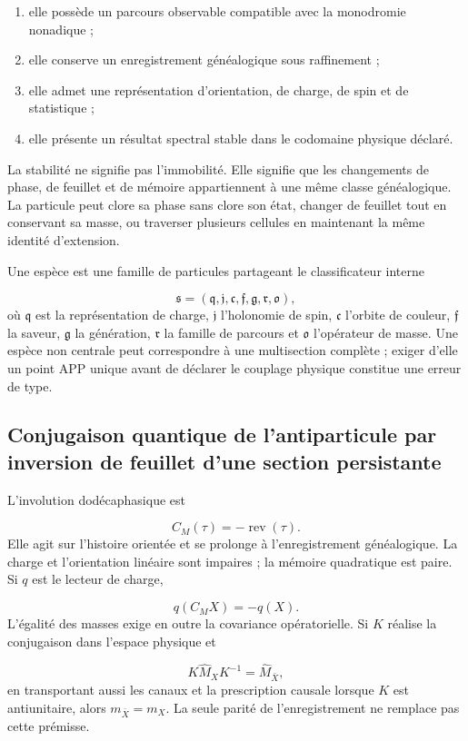 \begin{enumerate}
\item elle possède un parcours observable compatible avec la monodromie nonadique ;
\item elle conserve un enregistrement généalogique sous raffinement ;
\item elle admet une représentation d'orientation, de charge, de spin et de statistique ;
\item elle présente un résultat spectral stable dans le codomaine physique déclaré.
\end{enumerate}
La stabilité ne signifie pas l'immobilité. Elle signifie que les changements de phase, de feuillet et de mémoire appartiennent à une même classe généalogique. La particule peut clore sa phase sans clore son état, changer de feuillet tout en conservant sa masse, ou traverser plusieurs cellules en maintenant la même identité d'extension.

Une espèce est une famille de particules partageant le classificateur interne

\[
\mathfrak s=
(\mathfrak q,\mathfrak j,\mathfrak c,\mathfrak f,\mathfrak g,
\mathfrak r,\mathfrak o),
\]
où \(\mathfrak q\) est la représentation de charge, \(\mathfrak j\) l'holonomie de spin, \(\mathfrak c\) l'orbite de couleur, \(\mathfrak f\) la saveur, \(\mathfrak g\) la génération, \(\mathfrak r\) la famille de parcours et \(\mathfrak o\) l'opérateur de masse. Une espèce non centrale peut correspondre à une multisection complète ; exiger d'elle un point APP unique avant de déclarer le couplage physique constitue une erreur de type.

\subsection{Conjugaison quantique de l'antiparticule par inversion de feuillet d'une section persistante}
L'involution dodécaphasique est

\[
C_M(\tau)=-\operatorname{rev}(\tau).
\]
Elle agit sur l'histoire orientée et se prolonge à l'enregistrement généalogique. La charge et l'orientation linéaire sont impaires ; la mémoire quadratique est paire. Si \(q\) est le lecteur de charge,

\[
q(C_MX)=-q(X).
\]
L'égalité des masses exige en outre la covariance opératorielle. Si \(K\) réalise la conjugaison dans l'espace physique et

\[
K\widehat M_XK^{-1}=\widehat M_{\bar X},
\]
en transportant aussi les canaux et la prescription causale lorsque \(K\) est antiunitaire, alors \(m_{\bar X}=m_X\). La seule parité de l'enregistrement ne remplace pas cette prémisse.

